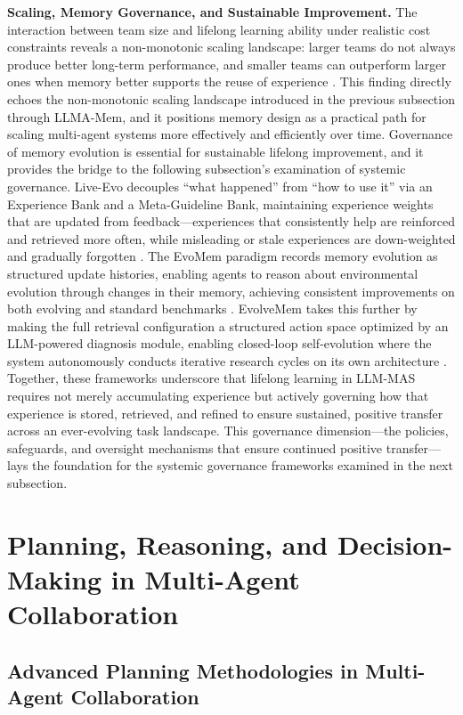 \documentclass[11pt]{article}
\begin{document}
\textbf{Scaling, Memory Governance, and Sustainable Improvement.} The interaction between team size and lifelong learning ability under realistic cost constraints reveals a non-monotonic scaling landscape: larger teams do not always produce better long-term performance, and smaller teams can outperform larger ones when memory better supports the reuse of experience \cite{ref127}. This finding directly echoes the non-monotonic scaling landscape introduced in the previous subsection through LLMA-Mem, and it positions memory design as a practical path for scaling multi-agent systems more effectively and efficiently over time. Governance of memory evolution is essential for sustainable lifelong improvement, and it provides the bridge to the following subsection's examination of systemic governance. Live-Evo decouples ``what happened'' from ``how to use it'' via an Experience Bank and a Meta-Guideline Bank, maintaining experience weights that are updated from feedback---experiences that consistently help are reinforced and retrieved more often, while misleading or stale experiences are down-weighted and gradually forgotten \cite{ref181}. The EvoMem paradigm records memory evolution as structured update histories, enabling agents to reason about environmental evolution through changes in their memory, achieving consistent improvements on both evolving and standard benchmarks \cite{ref182}. EvolveMem takes this further by making the full retrieval configuration a structured action space optimized by an LLM-powered diagnosis module, enabling closed-loop self-evolution where the system autonomously conducts iterative research cycles on its own architecture \cite{ref161}. Together, these frameworks underscore that lifelong learning in LLM-MAS requires not merely accumulating experience but actively governing how that experience is stored, retrieved, and refined to ensure sustained, positive transfer across an ever-evolving task landscape. This governance dimension---the policies, safeguards, and oversight mechanisms that ensure continued positive transfer---lays the foundation for the systemic governance frameworks examined in the next subsection.

\section{Planning, Reasoning, and Decision-Making in Multi-Agent Collaboration}

\subsection{Advanced Planning Methodologies in Multi-Agent Collaboration}
\end{document}
